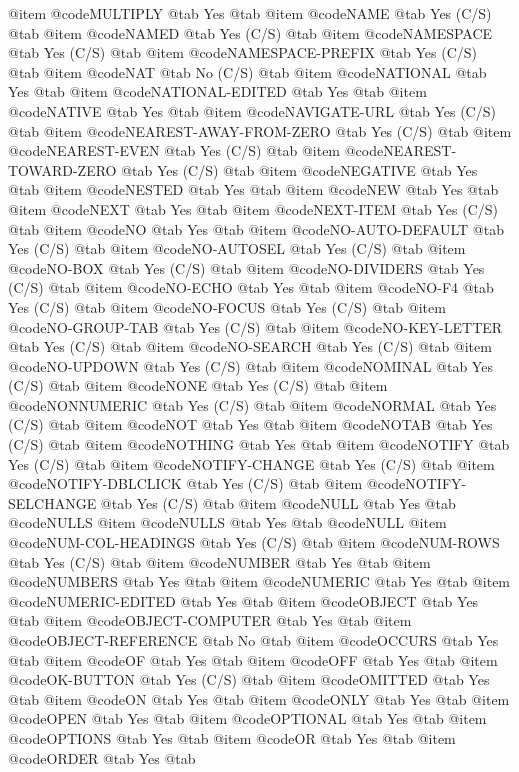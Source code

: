 @item @code{MULTIPLY} @tab Yes @tab 
@item @code{NAME} @tab Yes	(C/S) @tab 
@item @code{NAMED} @tab Yes	(C/S) @tab 
@item @code{NAMESPACE} @tab Yes	(C/S) @tab 
@item @code{NAMESPACE-PREFIX} @tab Yes	(C/S) @tab 
@item @code{NAT} @tab No	(C/S) @tab 
@item @code{NATIONAL} @tab Yes @tab 
@item @code{NATIONAL-EDITED} @tab Yes @tab 
@item @code{NATIVE} @tab Yes @tab 
@item @code{NAVIGATE-URL} @tab Yes	(C/S) @tab 
@item @code{NEAREST-AWAY-FROM-ZERO} @tab Yes	(C/S) @tab 
@item @code{NEAREST-EVEN} @tab Yes	(C/S) @tab 
@item @code{NEAREST-TOWARD-ZERO} @tab Yes	(C/S) @tab 
@item @code{NEGATIVE} @tab Yes @tab 
@item @code{NESTED} @tab Yes @tab 
@item @code{NEW} @tab Yes @tab 
@item @code{NEXT} @tab Yes @tab 
@item @code{NEXT-ITEM} @tab Yes	(C/S) @tab 
@item @code{NO} @tab Yes @tab 
@item @code{NO-AUTO-DEFAULT} @tab Yes	(C/S) @tab 
@item @code{NO-AUTOSEL} @tab Yes	(C/S) @tab 
@item @code{NO-BOX} @tab Yes	(C/S) @tab 
@item @code{NO-DIVIDERS} @tab Yes	(C/S) @tab 
@item @code{NO-ECHO} @tab Yes @tab 
@item @code{NO-F4} @tab Yes	(C/S) @tab 
@item @code{NO-FOCUS} @tab Yes	(C/S) @tab 
@item @code{NO-GROUP-TAB} @tab Yes	(C/S) @tab 
@item @code{NO-KEY-LETTER} @tab Yes	(C/S) @tab 
@item @code{NO-SEARCH} @tab Yes	(C/S) @tab 
@item @code{NO-UPDOWN} @tab Yes	(C/S) @tab 
@item @code{NOMINAL} @tab Yes	(C/S) @tab 
@item @code{NONE} @tab Yes	(C/S) @tab 
@item @code{NONNUMERIC} @tab Yes	(C/S) @tab 
@item @code{NORMAL} @tab Yes	(C/S) @tab 
@item @code{NOT} @tab Yes @tab 
@item @code{NOTAB} @tab Yes	(C/S) @tab 
@item @code{NOTHING} @tab Yes @tab 
@item @code{NOTIFY} @tab Yes	(C/S) @tab 
@item @code{NOTIFY-CHANGE} @tab Yes	(C/S) @tab 
@item @code{NOTIFY-DBLCLICK} @tab Yes	(C/S) @tab 
@item @code{NOTIFY-SELCHANGE} @tab Yes	(C/S) @tab 
@item @code{NULL} @tab Yes @tab @code{NULLS}
@item @code{NULLS} @tab Yes @tab @code{NULL}
@item @code{NUM-COL-HEADINGS} @tab Yes	(C/S) @tab 
@item @code{NUM-ROWS} @tab Yes	(C/S) @tab 
@item @code{NUMBER} @tab Yes @tab 
@item @code{NUMBERS} @tab Yes @tab 
@item @code{NUMERIC} @tab Yes @tab 
@item @code{NUMERIC-EDITED} @tab Yes @tab 
@item @code{OBJECT} @tab Yes @tab 
@item @code{OBJECT-COMPUTER} @tab Yes @tab 
@item @code{OBJECT-REFERENCE} @tab No @tab 
@item @code{OCCURS} @tab Yes @tab 
@item @code{OF} @tab Yes @tab 
@item @code{OFF} @tab Yes @tab 
@item @code{OK-BUTTON} @tab Yes	(C/S) @tab 
@item @code{OMITTED} @tab Yes @tab 
@item @code{ON} @tab Yes @tab 
@item @code{ONLY} @tab Yes @tab 
@item @code{OPEN} @tab Yes @tab 
@item @code{OPTIONAL} @tab Yes @tab 
@item @code{OPTIONS} @tab Yes @tab 
@item @code{OR} @tab Yes @tab 
@item @code{ORDER} @tab Yes @tab 
